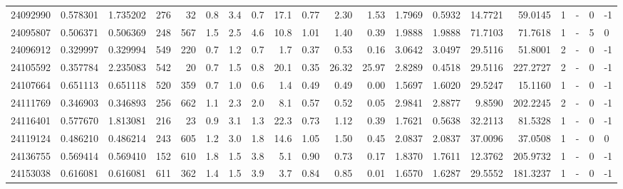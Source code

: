 \begin{tabular}{rrrrrrrrrrrrrrrrrlrl}
  24092990 & 0.578301 &   1.735202 &  276 &   32 &      0.8 &      3.4 &     0.7 &     17.1 &       0.77 &        2.30 &        1.53 &  1.7969 &  0.5932 &   14.7721 &   59.0145 &       1 &             - &        0 &        -1 \\
  24095807 & 0.506371 &   0.506369 &  248 &  567 &      1.5 &      2.5 &     4.6 &     10.8 &       1.01 &        1.40 &        0.39 &  1.9888 &  1.9888 &   71.7103 &   71.7618 &       1 &             - &        5 &         0 \\
  24096912 & 0.329997 &   0.329994 &  549 &  220 &      0.7 &      1.2 &     0.7 &      1.7 &       0.37 &        0.53 &        0.16 &  3.0642 &  3.0497 &   29.5116 &   51.8001 &       2 &             - &        0 &        -1 \\
  24105592 & 0.357784 &   2.235083 &  542 &   20 &      0.7 &      1.5 &     0.8 &     20.1 &       0.35 &       26.32 &       25.97 &  2.8289 &  0.4518 &   29.5116 &  227.2727 &       2 &             - &        0 &        -1 \\
  24107664 & 0.651113 &   0.651118 &  520 &  359 &      0.7 &      1.0 &     0.6 &      1.4 &       0.49 &        0.49 &        0.00 &  1.5697 &  1.6020 &   29.5247 &   15.1160 &       1 &             - &        0 &        -1 \\
  24111769 & 0.346903 &   0.346893 &  256 &  662 &      1.1 &      2.3 &     2.0 &      8.1 &       0.57 &        0.52 &        0.05 &  2.9841 &  2.8877 &    9.8590 &  202.2245 &       2 &             - &        0 &        -1 \\
  24116401 & 0.577670 &   1.813081 &  216 &   23 &      0.9 &      3.1 &     1.3 &     22.3 &       0.73 &        1.12 &        0.39 &  1.7621 &  0.5638 &   32.2113 &   81.5328 &       1 &             - &        0 &        -1 \\
  24119124 & 0.486210 &   0.486214 &  243 &  605 &      1.2 &      3.0 &     1.8 &     14.6 &       1.05 &        1.50 &        0.45 &  2.0837 &  2.0837 &   37.0096 &   37.0508 &       1 &             - &        0 &         0 \\
  24136755 & 0.569414 &   0.569410 &  152 &  610 &      1.8 &      1.5 &     3.8 &      5.1 &       0.90 &        0.73 &        0.17 &  1.8370 &  1.7611 &   12.3762 &  205.9732 &       1 &             - &        0 &        -1 \\
  24153038 & 0.616081 &   0.616081 &  611 &  362 &      1.4 &      1.5 &     3.9 &      3.7 &       0.84 &        0.85 &        0.01 &  1.6570 &  1.6287 &   29.5552 &  181.3237 &       1 &             - &        0 &        -1 \\

\end{tabular}
